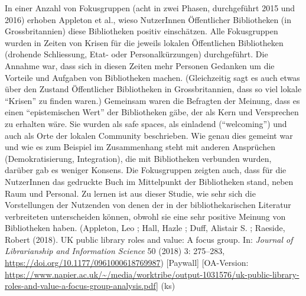 \documentclass[a4paper,
fontsize=11pt,
oneside,
numbers=noperiodatend,
parskip=half-,
bibliography=totoc,
final
]{scrartcl}
\begin{document}
In einer Anzahl von Fokusgruppen (acht in zwei Phasen, durchgeführt 2015
und 2016) erhoben Appleton et al., wieso NutzerInnen Öffentlicher
Bibliotheken (in Grossbritannien) diese Bibliotheken positiv
einschätzen. Alle Fokusgruppen wurden in Zeiten von Krisen für die
jeweils lokalen Öffentlichen Bibliotheken (drohende Schliessung, Etat-
oder Personalkürzungen) durchgeführt. Die Annahme war, dass sich in
diesen Zeiten mehr Personen Gedanken um die Vorteile und Aufgaben von
Bibliotheken machen. (Gleichzeitig sagt es auch etwas über den Zustand
Öffentlicher Bibliotheken in Grossbritannien, dass so viel lokale
\enquote{Krisen} zu finden waren.) Gemeinsam waren die Befragten der
Meinung, dass es einen \enquote{epistemischen Wert} der Bibliotheken
gäbe, der als Kern und Versprechen zu erhalten wäre. Sie wurden als safe
spaces, als einladend (\enquote{welcoming}) und auch als Orte der
lokalen Community beschrieben. Wie genau dies gemeint war und wie es zum
Beispiel im Zusammenhang steht mit anderen Ansprüchen (Demokratisierung,
Integration), die mit Bibliotheken verbunden wurden, darüber gab es
weniger Konsens. Die Fokusgruppen zeigten auch, dass für die NutzerInnen
das gedruckte Buch im Mittelpunkt der Bibliotheken stand, neben Raum und
Personal. Zu lernen ist aus dieser Studie, wie sehr sich die
Vorstellungen der Nutzenden von denen der in der bibliothekarischen
Literatur verbreiteten unterscheiden können, obwohl sie eine sehr
positive Meinung von Bibliotheken haben. (Appleton, Leo ; Hall, Hazle ;
Duff, Alistair S. ; Raeside, Robert (2018). UK public library roles and
value: A focus group. In: \emph{Journal of Librarianship and Information
Science} 50 (2018) 3: 275--283,
\url{https://doi.org/10.1177/0961000618769987}) {[}Paywall{]}
{[}OA-Version:
\url{https://www.napier.ac.uk/~/media/worktribe/output-1031576/uk-public-library-roles-and-value-a-focus-group-analysis.pdf}{]}
(ks)
\end{document}
